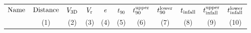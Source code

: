 
\begin{table*}
  \centering
  \begin{tabular}{lcccccccccc}
    \hline\hline
    $\rm Name$ & $\rm Distance$ & $V_{\rm 3D}$ & $V_{\rm r}$ & $\it e$
    & $t_{90}$ &  $t^{\rm upper}_{90}$ & $t^{\rm lower}_{90}$ &
                                                                $t_{\rm
                                                                infall}$
    &  $t^{\rm upper}_{\rm infall}$ &  $t^{\rm lower}_{\rm infall}$ \\

     & (1) & (2) & (3) & (4) & (5) & (6) & (7) & (8) & (9) & (10)  \\
    

\end{tabular}
\end{table*}
